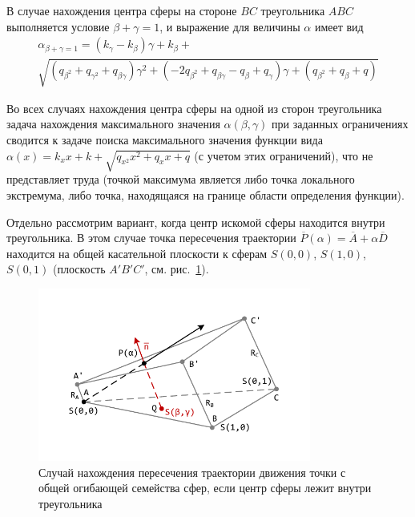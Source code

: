 В случае нахождения центра сферы на стороне $BC$ треугольника $ABC$ выполняется условие $\beta + \gamma = 1$, и выражение для величины $\alpha$ имеет вид
\begin{multline}
	\alpha_{\beta + \gamma = 1} = (k_{\gamma} - k_{\beta}) \gamma + k_{\beta} + \\
	\sqrt{(q_{\beta^2} + q_{\gamma^2} + q_{\beta \gamma}) \gamma^2 + (-2 q_{\beta^2} + q_{\beta \gamma} - q_{\beta} + q_{\gamma}) \gamma + (q_{\beta^2} + q_{\beta} + q)}
\end{multline}

Во всех случаях нахождения центра сферы на одной из сторон треугольника задача нахождения максимального значения $\alpha(\beta, \gamma)$ при заданных ограничениях сводится к задаче поиска максимального значения функции вида $\alpha(x) = k_x x + k + \sqrt{q_{x^2} x^2 + q_x x + q}$ (с учетом этих ограничений), что не представляет труда (точкой максимума является либо точка локального экстремума, либо точка, находящаяся на границе области определения функции).

Отдельно рассмотрим вариант, когда центр искомой сферы находится внутри треугольника.
В этом случае точка пересечения траектории $\overline{P}(\alpha) = \overline{A} + \alpha \overline{D}$ находится на общей касательной плоскости к сферам $S(0,0)$, $S(1,0)$, $S(0,1)$ (плоскость $A'B'C'$, см. рис.~\ref{fig:text_1_remesh_common_envelope_3}).

\begin{figure}[ht]
	\centering
		\includegraphics[width=0.80\textwidth]{./pics/text_1_remesh_common_envelope/case1.pdf}
	\caption{Случай нахождения пересечения траектории движения точки с общей огибающей семейства сфер, если центр сферы лежит внутри треугольника}
	\label{fig:text_1_remesh_common_envelope_3}
\end{figure}

